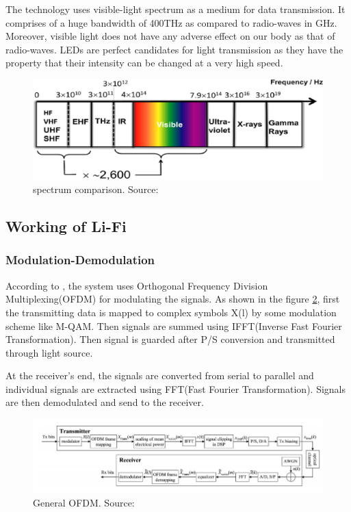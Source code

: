 \documentclass[notitlepage,hidelinks]{article}
\begin{document}
The technology uses visible-light spectrum as a medium for data transmission.
It comprises of a huge bandwidth of 400THz as compared to radio-waves in GHz.
Moreover, visible light does not have any adverse effect on our body as that of
radio-waves. LEDs are perfect candidates for light transmission as they have
the property that their intensity can be changed at a very high speed.


\begin{figure}[!h]
  \includegraphics[width=\linewidth]{res/spectrum_li_fi.jpg}
    \caption{spectrum comparison. Source: \parencite{hass18}}
  \label{fig:spectrum_li_fi}
\end{figure}




\subsection{Working of Li-Fi}


\subsubsection{Modulation-Demodulation}

According to \textcite{dimitrov12}, the system uses Orthogonal Frequency
Division Multiplexing(OFDM) for modulating the signals. As shown in the figure
\ref{fig:OFDM_li_fi}, first the transmitting data is mapped to complex symbols
X(l) by some modulation scheme like M-QAM.  Then signals are summed using
IFFT(Inverse Fast Fourier Transformation).  Then signal is guarded after P/S
conversion and transmitted through light source.

At the receiver's end, the signals are converted from serial to parallel and
individual signals are extracted using FFT(Fast Fourier Transformation).
Signals are then demodulated and send to the receiver.

\begin{figure}[!h]
  \includegraphics[width=\linewidth]{res/OFDM_li_fi.PNG}
    \caption{General OFDM. Source: \parencite{dimitrov12}}
  \label{fig:OFDM_li_fi}
\end{figure}
\end{document}
